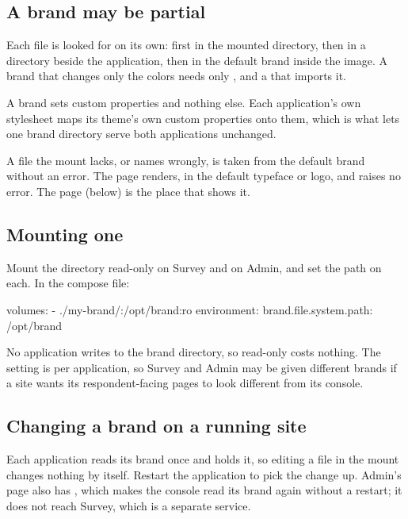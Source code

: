 \documentclass[11pt, a4paper]{article}
\begin{document}
\subsection{A brand may be partial}

Each file is looked for on its own: first in the mounted directory, then in a 
directory beside the application, then in the default brand inside the image. A brand that
changes only the colors needs only , and a  that
imports it.

A brand sets  custom properties and nothing else. Each application's own
stylesheet maps its theme's own custom properties onto them, which is what lets one brand directory serve both
applications unchanged.

\begin{elicitcaution}
A file the mount lacks, or names wrongly, is taken from the default brand without an error. The
page renders, in the default typeface or logo, and raises no error. The  page
(below) is the place that shows it.
\end{elicitcaution}

\subsection{Mounting one}

Mount the directory read-only on Survey and on Admin, and set the path on each. In the compose
file:

\begin{elicitcmd}
volumes:
  - ./my-brand/:/opt/brand:ro
environment:
  brand.file.system.path: /opt/brand
\end{elicitcmd}

No application writes to the brand directory, so read-only costs nothing. The setting is per
application, so Survey and Admin may be given different brands if a site wants its
respondent-facing pages to look different from its console.


\subsection{Changing a brand on a running site}

Each application reads its brand once and holds it, so editing a file in the mount changes
nothing by itself. Restart the application to pick the change up. Admin's  page
also has , which makes the console read its brand again without a restart; it
does not reach Survey, which is a separate service.
\end{document}
